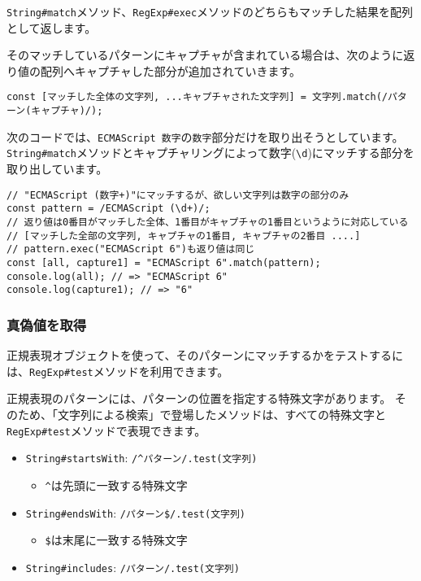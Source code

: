 \texttt{String\#match}メソッド、\texttt{RegExp\#exec}メソッドのどちらもマッチした結果を配列として返します。

そのマッチしているパターンにキャプチャが含まれている場合は、次のように返り値の配列へキャプチャした部分が追加されていきます。

\begin{lstlisting}
const [マッチした全体の文字列, ...キャプチャされた文字列] = 文字列.match(/パターン(キャプチャ)/);
\end{lstlisting}

次のコードでは、\texttt{ECMAScript 数字}の\texttt{数字}部分だけを取り出そうとしています。
\texttt{String\#match}メソッドとキャプチャリングによって数字(\texttt{\textbackslash d})にマッチする部分を取り出しています。

\begin{lstlisting}
// "ECMAScript (数字+)"にマッチするが、欲しい文字列は数字の部分のみ
const pattern = /ECMAScript (\d+)/;
// 返り値は0番目がマッチした全体、1番目がキャプチャの1番目というように対応している
// [マッチした全部の文字列, キャプチャの1番目, キャプチャの2番目 ....]
// pattern.exec("ECMAScript 6")も返り値は同じ
const [all, capture1] = "ECMAScript 6".match(pattern);
console.log(all); // => "ECMAScript 6"
console.log(capture1); // => "6"
\end{lstlisting}

\hypertarget{test-by-regexp}{%
\subsubsection{真偽値を取得}\label{test-by-regexp}}

正規表現オブジェクトを使って、そのパターンにマッチするかをテストするには、\texttt{RegExp\#test}メソッドを利用できます。

正規表現のパターンには、パターンの位置を指定する特殊文字があります。
そのため、「文字列による検索」で登場したメソッドは、すべての特殊文字と\texttt{RegExp\#test}メソッドで表現できます。

\begin{itemize}
\item
  \texttt{String\#startsWith}:
  \texttt{/\^{}パターン/.test(文字列)}

  \begin{itemize}
  \item
    \texttt{\^{}}は先頭に一致する特殊文字
  \end{itemize}
\item
  \texttt{String\#endsWith}:
  \texttt{/パターン\$/.test(文字列)}

  \begin{itemize}
  \item
    \texttt{\$}は末尾に一致する特殊文字
  \end{itemize}
\item
  \texttt{String\#includes}:
  \texttt{/パターン/.test(文字列)}
\end{itemize}

